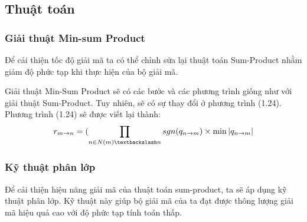 \documentclass{article}
\begin{document}
\subsection{Thuật toán}
\subsubsection{Giải thuật Min-sum Product}
Để cải thiện tốc độ giải mã ta có thể chỉnh sửa lại thuật toán Sum-Product nhằm giảm độ phức tạp khi thực hiện của bộ giải mã.

Giải thuật Min-Sum Product sẽ có các bước và các phương trình giống như với giải thuật Sum-Product. Tuy nhiên, sẽ có sự thay đổi ở phương trình (1.24). Phương trình (1.24) sẽ được viết lại thành:
   \begin{equation}\label{138}
       r_{m \to n} = (\prod_{n \in N(m) \textbackslash n} sgn(q_{n \to m}) \times \min |q_{n \to m}|
   \end{equation}
\subsubsection{Kỹ thuật phân lớp}
Để cải thiện hiệu năng giải mã của thuật toán sum-product, ta sẽ áp dụng kỹ thuật phân lớp. Kỹ thuật này giúp bộ giải mã của ta đạt được thông lượng giải mã hiệu quả cao với độ phức tạp tính toán thấp.
\end{document}
